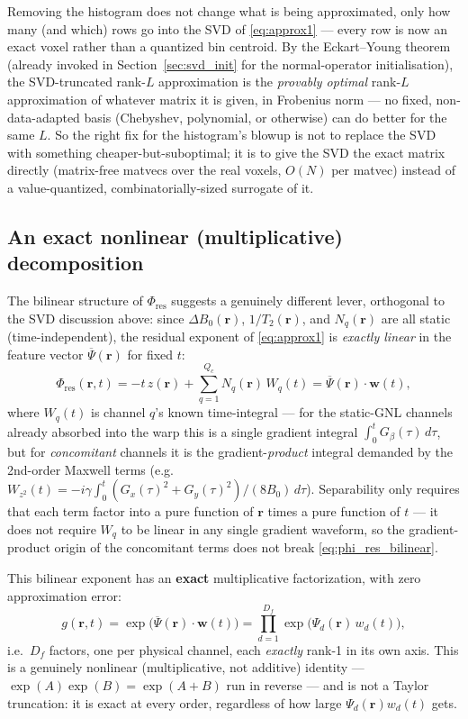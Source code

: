 \documentclass{article}
\begin{document}
Removing the histogram does not change what is being approximated, only how many (and which)
rows go into the SVD of \eqref{eq:approx1} — every row is now an exact voxel rather than a
quantized bin centroid. By the Eckart--Young theorem (already invoked in
Section~\ref{sec:svd_init} for the normal-operator initialisation), the SVD-truncated rank-$L$
approximation is the \emph{provably optimal} rank-$L$ approximation of whatever matrix it is
given, in Frobenius norm — no fixed, non-data-adapted basis (Chebyshev, polynomial, or otherwise)
can do better for the same $L$. So the right fix for the histogram's blowup is not to replace the
SVD with something cheaper-but-suboptimal; it is to give the SVD the exact matrix directly
(matrix-free matvecs over the real voxels, $O(N)$ per matvec) instead of a value-quantized,
combinatorially-sized surrogate of it.

\subsection{An exact nonlinear (multiplicative) decomposition}
\label{sec:nonlinear_decomp}

The bilinear structure of $\Phi_{\mathrm{res}}$ suggests a genuinely different lever, orthogonal
to the SVD discussion above: since $\Delta B_0(\mathbf{r})$, $1/T_2(\mathbf{r})$, and
$N_q(\mathbf{r})$ are all static (time-independent), the residual exponent of \eqref{eq:approx1}
is \emph{exactly linear} in the feature vector $\overline\Psi(\mathbf{r})$ for fixed $t$:
\begin{equation}
    \Phi_{\mathrm{res}}(\mathbf{r}, t) = -t\,z(\mathbf{r}) + \sum_{q=1}^{Q_c} N_q(\mathbf{r})\,W_q(t)
    = \overline\Psi(\mathbf{r}) \cdot \mathbf{w}(t),
    \label{eq:phi_res_bilinear}
\end{equation}
where $W_q(t)$ is channel $q$'s known time-integral — for the static-GNL channels already
absorbed into the warp this is a single gradient integral $\int_0^t G_\beta(\tau)\,d\tau$, but for
\emph{concomitant} channels it is the gradient-\emph{product} integral demanded by the 2nd-order
Maxwell terms (e.g.\ $W_{z^2}(t) = -i\gamma\int_0^t (G_x(\tau)^2+G_y(\tau)^2)/(8B_0)\,d\tau$).
Separability only requires that each term factor into a pure function of $\mathbf{r}$ times a
pure function of $t$ — it does not require $W_q$ to be linear in any single gradient waveform, so
the gradient-product origin of the concomitant terms does not break
\eqref{eq:phi_res_bilinear}.

This bilinear exponent has an \textbf{exact} multiplicative factorization, with zero
approximation error:
\begin{equation}
    g(\mathbf{r},t) = \exp\bigl(\overline\Psi(\mathbf{r})\cdot\mathbf{w}(t)\bigr)
    = \prod_{d=1}^{D_f} \exp\bigl(\Psi_d(\mathbf{r})\,w_d(t)\bigr),
    \label{eq:exact_product_decomp}
\end{equation}
i.e.\ $D_f$ factors, one per physical channel, each \emph{exactly} rank-1 in its own axis. This is
a genuinely nonlinear (multiplicative, not additive) identity — $\exp(A)\exp(B)=\exp(A+B)$ run in
reverse — and is not a Taylor truncation: it is exact at every order, regardless of how large
$\Psi_d(\mathbf{r})w_d(t)$ gets.
\end{document}
